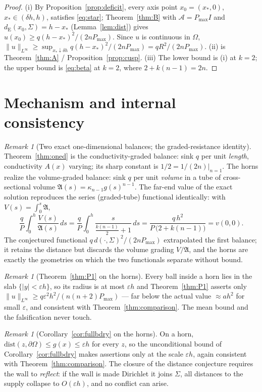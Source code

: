 \documentclass[10pt]{article}
\theoremstyle{remark}
\newtheorem{remark}[theorem]{Remark}
\newcommand{\A}{\mathcal{A}}
\newcommand{\Om}{\Omega}
\newcommand{\Sig}{\Sigma}
\newcommand{\Pmax}{P_{\max}}
\newcommand{\dE}{d_{\mathrm{E}}}
\newcommand{\norminf}[1]{\|#1\|_{L^\infty}}
\newcommand{\eps}{\varepsilon}
\begin{document}
\begin{proof}
(i) By Proposition~\ref{prop:deficit}, every axis point
$x_0=(x_*,0)$, $x_*\in(\delta h,h)$, satisfies \eqref{eq:star};
Theorem~\ref{thm:B} with $\A=\Pmax I$ and
$\dE(x_0,\Sig)=h-x_*$ (Lemma~\ref{lem:dist}) gives
$u(x_0)\ge q(h-x_*)^2/(2n\Pmax)$. Since $u$ is continuous in $\Om$,
$\norminf{u}\ge\sup_{x_*\downarrow\delta h}q(h-x_*)^2/(2n\Pmax)
=qR^2/(2n\Pmax)$.
(ii) is Theorem~\ref{thm:A} / Proposition~\ref{prop:cusp}.
(iii) The lower bound is (i) at $k=2$; the upper bound is \eqref{eq:beta} at
$k=2$, where $2+k(n-1)=2n$.
\end{proof}

\section{Mechanism and internal consistency}\label{sec:mechanism}

\begin{remark}[Two exact one-dimensional balances; the graded-resistance
identity]\label{rem:mechanism}
Theorem~\ref{thm:oned} is the conductivity-graded balance: sink $q$ per unit
\emph{length}, conductivity $A(x)$ varying; its sharp constant is
$1/2=1/(2n)|_{n=1}$. The horns realize the volume-graded balance: sink $q$ per
unit \emph{volume} in a tube of cross-sectional volume
$\mathfrak A(s)=\kappa_{n-1}g(s)^{n-1}$. The far-end value of the exact
solution reproduces the series (graded-tube) functional identically: with
$V(s)=\int_0^s\mathfrak A$,
\[
\frac{q}{P}\int_0^h\frac{V(s)}{\mathfrak A(s)}\,ds
=\frac{q}{P}\int_0^h\frac{s}{\tfrac{k(n-1)}{2}+1}\,ds
=\frac{q\,h^2}{P\,\bigl(2+k(n-1)\bigr)}
=v(0,0).
\]
The conjectured functional $q\,d(\cdot,\Sig)^2/(2n\Pmax)$ extrapolated the
first balance; it retains the distance but discards the volume grading
$V/\mathfrak A$, and the horns are exactly the geometries on which the two
functionals separate without bound.
\end{remark}

\begin{remark}[Theorem~\ref{thm:P1} on the horns]\label{rem:p1horn}
Every ball inside a horn lies in the slab $\{|y|<\eps h\}$, so its radius is at
most $\eps h$ and Theorem~\ref{thm:P1} asserts only
$\norminf u\ge q\eps^2h^2/(n(n+2)\Pmax)$ --- far below the actual value
$\approx ah^2$ for small $\eps$, and consistent with
Theorem~\ref{thm:comparison}. The mean bound and the falsification never
touch.
\end{remark}

\begin{remark}[Corollary~\ref{cor:fullbdry} on the horns]\label{rem:fullbdryhorn}
On a horn, $\mathrm{dist}(z,\partial\Om)\le g(x)\le\eps h$ for every $z$, so
the unconditional bound of Corollary~\ref{cor:fullbdry} makes assertions only
at the scale $\eps h$, again consistent with Theorem~\ref{thm:comparison}. The
closure of the distance conjecture requires the wall to \emph{reflect}: if the
wall is made Dirichlet it joins $\Sig$, all distances to the supply collapse to
$O(\eps h)$, and no conflict can arise.
\end{remark}
\end{document}
